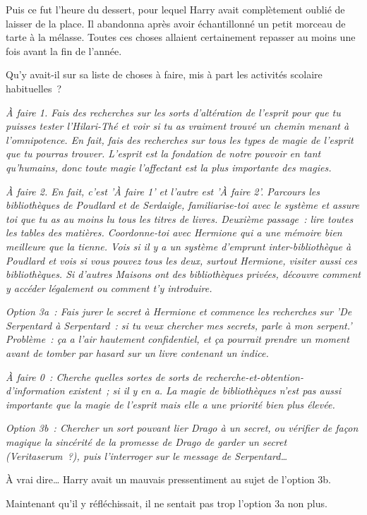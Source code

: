 Puis ce fut l'heure du dessert, pour lequel Harry avait complètement oublié de laisser de la place. Il abandonna après avoir échantillonné un petit morceau de tarte à la mélasse. Toutes ces choses allaient certainement repasser au moins une fois avant la fin de l'année.

Qu'y avait-il sur sa liste de choses à faire, mis à part les activités scolaire habituelles~?

\emph{À faire 1. Fais des recherches sur les sorts d'altération de l'esprit pour que tu puisses tester l'Hilari-Thé et voir si tu as vraiment trouvé un chemin menant à l'omnipotence. En fait, fais des recherches sur tous les types de magie de l'esprit que tu pourras trouver. L'esprit est la fondation de notre pouvoir en tant qu'humains, donc toute magie l'affectant est la plus importante des magies.}

\emph{À faire 2. En fait, c'est 'À faire 1' et l'autre est 'À faire 2'. Parcours les bibliothèques de Poudlard et de Serdaigle, familiarise-toi avec le système et assure toi que tu as au moins lu tous les titres de livres. Deuxième passage~: lire toutes les tables des matières. Coordonne-toi avec Hermione qui a une mémoire bien meilleure que la tienne. Vois si il y a un système d'emprunt inter-bibliothèque à Poudlard et vois si vous pouvez tous les deux, surtout Hermione, visiter aussi ces bibliothèques. Si d'autres Maisons ont des bibliothèques privées, découvre comment y accéder légalement ou comment t'y introduire.}

\emph{Option 3a~: Fais jurer le secret à Hermione et commence les recherches sur 'De Serpentard à Serpentard~: si tu veux chercher mes secrets, parle à mon serpent.' Problème~: ça a l'air hautement confidentiel, et ça pourrait prendre un moment avant de tomber par hasard sur un livre contenant un indice.}

\emph{À faire 0~: Cherche quelles sortes de sorts de recherche-et-obtention-d'information existent~; si il y en a. La magie de bibliothèques n'est pas aussi importante que la magie de l'esprit mais elle a une priorité bien plus élevée.}

\emph{Option 3b~: Chercher un sort pouvant lier Drago à un secret, ou vérifier de façon magique la sincérité de la promesse de Drago de garder un secret (Veritaserum~?), puis l'interroger sur le message de Serpentard…}

À vrai dire… Harry avait un mauvais pressentiment au sujet de l'option 3b.

Maintenant qu'il y réfléchissait, il ne sentait pas trop l'option 3a non plus.

